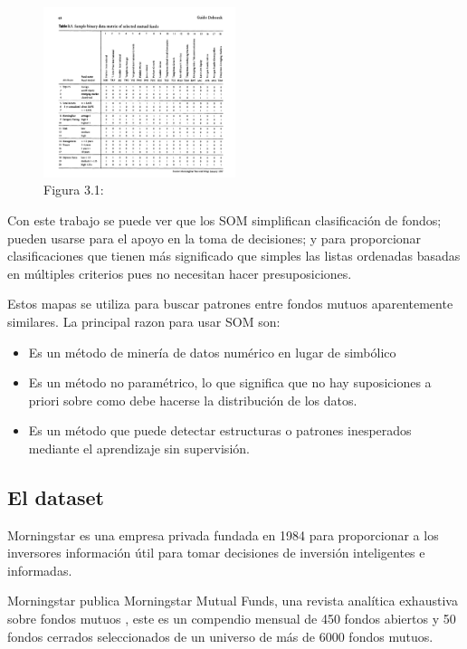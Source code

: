 \documentclass[fleqn, journal, onecolumn]{IEEEtran}             %
\newcommand \Quote              {\qq}                           %
\theoremstyle{break}                                            %
\begin{document}
      \begin{figure}
        \centering
        \includegraphics[width=0.5\textwidth]{Table3}
        \caption{Figura 3.1: \cite{Visual}}
      \end{figure}
      
      Con este trabajo se puede ver que los SOM simplifican clasificación de fondos;
      pueden usarse para el apoyo en la toma de decisiones; y para proporcionar
      clasificaciones que tienen más significado que simples las listas ordenadas basadas en múltiples
      criterios pues no necesitan hacer presuposiciones.

      Estos mapas se utiliza para buscar patrones entre fondos mutuos aparentemente similares. 
      La principal razon para usar SOM son:
      \begin{itemize}
        \item Es un método de minería de datos numérico en lugar de simbólico
        \item Es un método no paramétrico, lo que significa que no hay suposiciones a priori sobre
          como debe hacerse la distribución de los datos.
        \item Es un método que puede detectar estructuras o patrones inesperados mediante el aprendizaje
        sin supervisión.
      \end{itemize}

      \subsection{El dataset}

        Morningstar es una empresa privada fundada en 1984 para proporcionar a los inversores 
        información útil para tomar decisiones de inversión inteligentes e informadas. 
        
        Morningstar publica Morningstar Mutual Funds, una revista analítica exhaustiva sobre 
        fondos mutuos \Quote{Morningstar Investor}, este es un compendio mensual de 450 fondos abiertos
        y 50 fondos cerrados seleccionados de un universo de más de 6000 fondos mutuos. 
         
\end{document}
